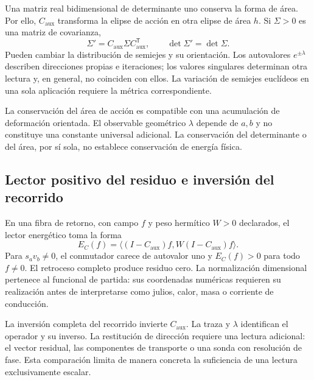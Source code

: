 Una matriz real bidimensional de determinante uno conserva la forma
de área. Por ello, $C_{\mathrm{aux}}$ transforma la elipse de
acción en otra elipse de área $h$. Si $\Sigma>0$ es una matriz
de covarianza,
\begin{equation}
 \Sigma'=C_{\mathrm{aux}}\Sigma C_{\mathrm{aux}}^{\mathsf T},
 \qquad \det\Sigma'=\det\Sigma.
 \label{md:aux:covarianza-area}
\end{equation}
Pueden cambiar la distribución de semiejes y su orientación.
Los autovalores $e^{\pm\lambda}$ describen direcciones propias e
iteraciones; los valores singulares determinan otra lectura y, en
general, no coinciden con ellos. La variación de semiejes euclídeos
en una sola aplicación requiere la métrica correspondiente.

La conservación del área de acción es compatible con una
acumulación de deformación orientada. El observable geométrico
$\lambda$ depende de $a,b$ y no constituye una constante universal
adicional. La conservación del determinante o del área, por sí
sola, no establece conservación de energía física.

\subsection{Lector positivo del residuo e inversión del recorrido}
\label{md:aux:residuo}

En una fibra de retorno, con campo $f$ y peso hermítico $W>0$
declarados, el lector energético toma la forma
\begin{equation}
 E_C(f)=\langle(I-C_{\mathrm{aux}})f,
                  W(I-C_{\mathrm{aux}})f\rangle.
 \label{md:aux:energia-residuo}
\end{equation}
Para $s_av_b\ne0$, el conmutador carece de autovalor uno y
$E_C(f)>0$ para todo $f\ne0$. El retroceso completo produce residuo
cero. La normalización dimensional pertenece al funcional de
partida: sus coordenadas numéricas requieren su realización antes
de interpretarse como julios, calor, masa o corriente de conducción.

La inversión completa del recorrido invierte $C_{\mathrm{aux}}$.
La traza y $\lambda$ identifican el operador y su inverso. La
restitución de dirección requiere una lectura adicional: el vector
residual, las componentes de transporte o una sonda con resolución
de fase. Esta comparación limita de manera concreta la suficiencia
de una lectura exclusivamente escalar.

